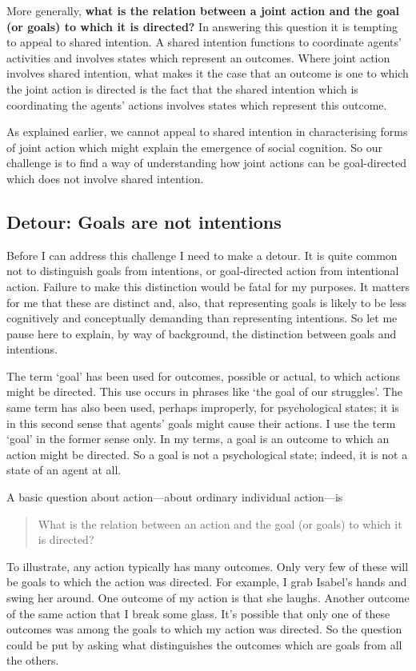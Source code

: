 \documentclass[12pt,a4paper]{extarticle}
\begin{document}
More generally, \textbf{what is the relation between a joint action and the goal (or goals) to which it is directed?}
In answering this question it is tempting to appeal to shared intention.
A shared intention  functions to coordinate agents' activities and involves states which represent an outcomes.
Where joint action involves shared intention, what makes it the case that an outcome is one to which the joint action is directed is the fact that the shared intention which is coordinating the agents' actions involves states which represent this outcome.

As explained earlier, we cannot appeal to shared intention in characterising forms of joint action which might explain the emergence of social cognition.
So our challenge is to find a way of understanding how joint actions can be goal-directed which does not involve shared intention.

\subsection{Detour: Goals are not intentions}
Before I can address this challenge I need to make a detour.
It is quite common not to distinguish goals from intentions, or goal-directed action from intentional action.
Failure to make this distinction would be fatal for my purposes.
It matters for me that these are distinct and, also, that representing goals is likely to be  less cognitively and conceptually demanding than representing intentions.
So let me pause here to explain, by way of background, the distinction between goals and intentions.


The term `goal' has been used for outcomes, possible or actual, to which actions might be directed.
This use occurs in phrases like `the goal of our struggles'.  
The same term has also been used, perhaps improperly, for psychological states; it is in this second sense that agents' goals might cause their actions.  
I use the term `goal' in the former sense only.
In my terms, a goal is an outcome to which an action might be directed.
So a goal is not a psychological state; indeed, it is not a state of an agent at all.

A basic question about action---about ordinary individual action---is
%
\begin{quote}
What is the relation between an action and the goal (or goals) to which it is directed?
\end{quote}
%
To illustrate, any action typically has many outcomes.
Only very few of these will be goals to which the action was directed.
For example, I grab Isabel's hands and swing her around.
One outcome of my action is that she laughs.
Another outcome of the same action that I break some glass.
It's possible that only one of these outcomes was among the goals to which my action was directed.
So the question could be put by asking what distinguishes the outcomes which are goals from all the others.
\end{document}
